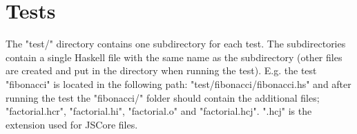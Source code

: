 \section{Tests}

The "test/" directory contains one subdirectory for each test. The
subdirectories contain a single Haskell file with the same name as the
subdirectory (other files are created and put in the directory when running
the test). E.g. the test "fibonacci" is located in the following path:
"test/fibonacci/fibonacci.hs" and after running the test the "fibonacci/"
folder should contain the additional files; "factorial.hcr", "factorial.hi",
"factorial.o" and "factorial.hcj". ".hcj" is the extension used for JSCore
files.

